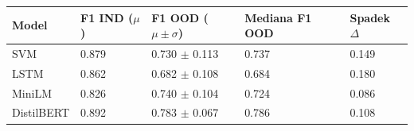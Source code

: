 \begin{tabularx}{\textwidth}{@{}lYYYY@{}}
\hline
Model & F1 IND ($\mu$) & F1 OOD ($\mu\pm\sigma$) & Mediana F1 OOD & Spadek $\Delta$ \\
\hline
SVM & 0.879 & 0.730 $\pm$ 0.113 & 0.737 & 0.149 \\
LSTM & 0.862 & 0.682 $\pm$ 0.108 & 0.684 & 0.180 \\
MiniLM & 0.826 & 0.740 $\pm$ 0.104 & 0.724 & 0.086 \\
DistilBERT & 0.892 & 0.783 $\pm$ 0.067 & 0.786 & 0.108 \\
\hline
\end{tabularx}
